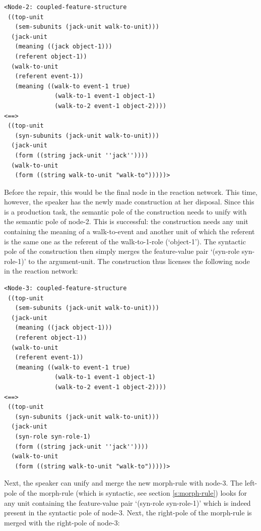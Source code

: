 \ea
\begin{lstlisting}
<Node-2: coupled-feature-structure
 ((top-unit
   (sem-subunits (jack-unit walk-to-unit)))
  (jack-unit
   (meaning ((jack object-1)))
   (referent object-1))
  (walk-to-unit
   (referent event-1))
   (meaning ((walk-to event-1 true)
              (walk-to-1 event-1 object-1)
              (walk-to-2 event-1 object-2))))
<==>
 ((top-unit
   (syn-subunits (jack-unit walk-to-unit)))
  (jack-unit
   (form ((string jack-unit ''jack''))))
  (walk-to-unit
   (form ((string walk-to-unit "walk-to")))))>
\end{lstlisting}
\z


Before the repair, this would be the final node in the reaction network. This time, however, the speaker has the newly made construction at her disposal. Since this is a production task, the semantic pole of the construction needs to unify with the semantic pole of node-2. This is successful: the construction needs any unit containing the meaning of a walk-to-event and another unit of which the referent is the same one as the referent of the walk-to-1-role (`object-1'). The syntactic pole of the construction then simply merges the feature-value pair `(syn-role syn-role-1)' to the argument-unit. The construction thus licenses the following node in the reaction network:


\ea
\begin{lstlisting}
<Node-3: coupled-feature-structure
 ((top-unit
   (sem-subunits (jack-unit walk-to-unit)))
  (jack-unit
   (meaning ((jack object-1)))
   (referent object-1))
  (walk-to-unit
   (referent event-1))
   (meaning ((walk-to event-1 true)
              (walk-to-1 event-1 object-1)
              (walk-to-2 event-1 object-2))))
<==>
 ((top-unit
   (syn-subunits (jack-unit walk-to-unit)))
  (jack-unit
   (syn-role syn-role-1)
   (form ((string jack-unit ''jack''))))
  (walk-to-unit
   (form ((string walk-to-unit "walk-to")))))>
\end{lstlisting}
\z


Next, the speaker can unify and merge the new morph-rule with node-3. The left-pole of the morph-rule (which is syntactic, see section \ref{s:morph-rule}) looks for any unit containing the feature-value pair `(syn-role syn-role-1)' which is indeed present in the syntactic pole of node-3. Next, the right-pole of the morph-rule is merged with the right-pole of node-3:


